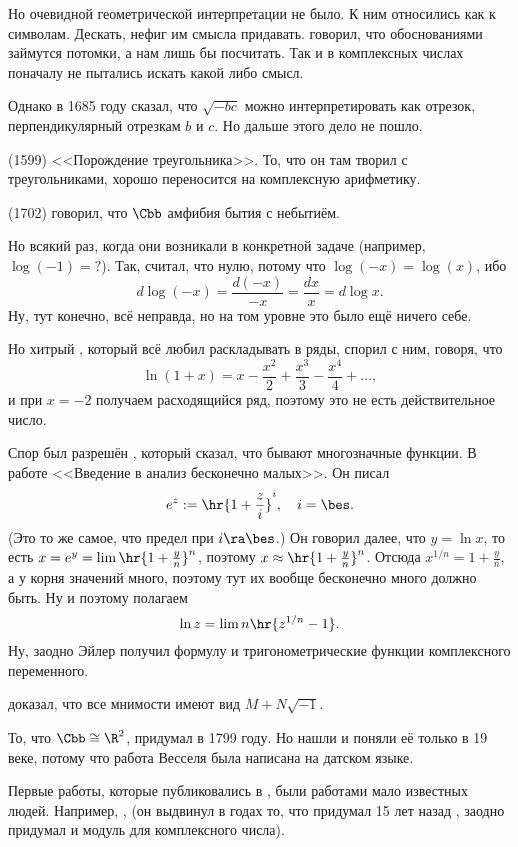 \documentclass[a4paper,oneside,fleqn,10pt]{article}
\begin{document}
Но очевидной геометрической интерпретации не было. К ним относились как к символам.
Дескать, нефиг им смысла придавать.  говорил, что обоснованиями займутся потомки,
а нам лишь бы посчитать. Так и в комплексных числах поначалу не пытались искать
какой либо смысл.

Однако  в 1685 году сказал, что $\sqrt{-bc}$ можно интерпретировать как
отрезок, перпендикулярный отрезкам $b$ и $c$. Но дальше этого дело не пошло.

 (1599) <<Порождение треугольника>>. То, что он там творил с треугольниками,
хорошо переносится на комплексную арифметику.

 (1702) говорил, что $\Cbb$ амфибия бытия с небытиём.

Но всякий раз, когда они возникали в конкретной задаче (например, $\log(-1) = ?$).
Так,  считал, что нулю, потому что $\log(-x) = \log(x)$,
ибо $$d\log(-x) = \frac{d(-x)}{-x} = \frac{dx}{x} = d\log x.$$
Ну, тут конечно, всё неправда, но на том уровне это было ещё ничего себе.

Но хитрый , который всё любил раскладывать в ряды, спорил с ним, говоря, что
$$\ln(1+x) = x - \frac{x^2}{2} + \frac{x^3}{3} - \frac{x^4}{4} + \dots,$$
и при $x = -2$ получаем расходящийся ряд, поэтому это не есть действительное число.

Спор был разрешён , который сказал, что бывают многозначные функции.
В работе <<Введение в анализ бесконечно малых>>.
Он писал
$$e^z := \hr{1 + \frac{z}{i}}^i, \quad i = \bes.$$
(Это то же самое, что предел при $i \ra \bes$.)
Он говорил далее, что $y = \ln x$, то есть $x = e^y = \lim\hr{1 + \frac{y}{n}}^n$,
поэтому $x \approx \hr{1 + \frac{y}{n}}^n$.
Отсюда $x^{1/n} = 1 + \frac{y}{n}$, а у корня значений много, поэтому тут их вообще бесконечно много
должно быть. Ну и поэтому полагаем
$$\ln z = \lim n \hr{z^{1/n} - 1}.$$
Ну, заодно Эйлер получил формулу  и тригонометрические функции комплексного переменного.

 доказал, что все мнимости имеют вид $M + N \sqrt{-1}$.

То, что $\Cbb \cong \R^2$, придумал  
в 1799 году. Но нашли и поняли её только в 19 веке, потому что работа Весселя была
написана на датском языке.

Первые работы, которые публиковались в ,
были работами мало известных людей.
Например, ,  (он выдвинул в  годах то, что придумал 15 лет назад ,
заодно придумал и модуль для комплексного числа).
\end{document}

